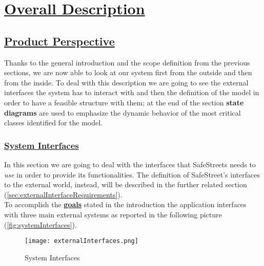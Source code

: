 \section[Overall Description]{\hyperlink{toc}{Overall Description}}
\label{sec:overallDescription}
\subsection[Product Perspective]{\hyperlink{toc}{Product Perspective}}
	Thanks to the general introduction and the scope definition from the previous sections, we are now able to look at our system first from the outside and then from the inside. To deal with this description we are going to see the external interfaces the system has to interact with and then the definition of the model in order to have a feasible structure with them; at the end of the section \textbf{state diagrams} are used to emphasize the dynamic behavior of the most critical classes identified for the model.
	\subsubsection[System Interfaces]{\hyperlink{toc}{System Interfaces}}
		\label{sec:systemInterfaces}
		In this section we are going to deal with the interfaces that SafeStreets needs to \emph{use} in order to provide its functionalities. The definition of SafeStreet's interfaces to the external world, instead, will be described in the further related section (\ref{sec:externalInterfaceRequirements}).\\
	
		To accomplish the \hyperref[sec:goals]{\textbf{goals}} stated in the introduction the application interfaces with three main external systems as reported in the following picture (\autoref{fig:systemInterfaces}).  
		\vspace{0,3cm}
		
		\begin{figure}[h]
			\centering
			\texttt{[image: externalInterfaces.png]}
			\caption{\label{fig:systemInterfaces}System Interfaces}
		\end{figure}
		
